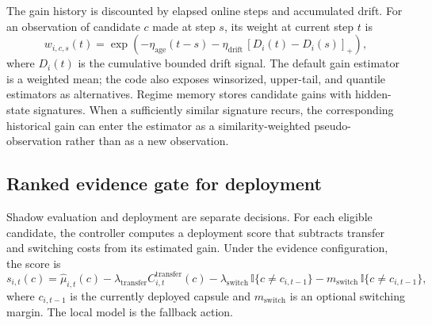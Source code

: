 \documentclass{article}
\theoremstyle{definition}
\begin{document}
The gain history is discounted by elapsed online steps and accumulated drift. For an observation of candidate \(c\) made at step \(s\), its weight at current step \(t\) is
\begin{equation}
w_{i,c,s}(t)
 =
 \exp\!\left(
  -\eta_{\mathrm{age}}(t-s)
  -\eta_{\mathrm{drift}}\,[D_i(t)-D_i(s)]_+
 \right),
 \label{eq:weight}
\end{equation}
where \(D_i(t)\) is the cumulative bounded drift signal. The default gain estimator is a weighted mean; the code also exposes winsorized, upper-tail, and quantile estimators as alternatives. Regime memory stores candidate gains with hidden-state signatures. When a sufficiently similar signature recurs, the corresponding historical gain can enter the estimator as a similarity-weighted pseudo-observation rather than as a new observation.

\subsection{Ranked evidence gate for deployment}

Shadow evaluation and deployment are separate decisions. For each eligible candidate, the controller computes a deployment score that subtracts transfer and switching costs from its estimated gain. Under the evidence configuration, the score is
\begin{equation}
s_{i,t}(c)
 =
 \widehat{\mu}_{i,t}(c)
 - \lambda_{\mathrm{transfer}}C_{i,t}^{\mathrm{transfer}}(c)
 - \lambda_{\mathrm{switch}}\,
   \mathbb{I}\{c\ne c_{i,t-1}\}
 - m_{\mathrm{switch}}\,
   \mathbb{I}\{c\ne c_{i,t-1}\},
 \label{eq:deployscore}
\end{equation}
where \(c_{i,t-1}\) is the currently deployed capsule and \(m_{\mathrm{switch}}\) is an optional switching margin. The local model is the fallback action.
\end{document}
